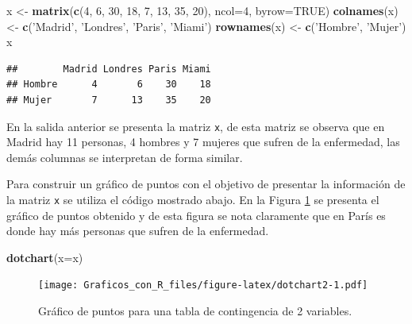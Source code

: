 \documentclass[10pt,]{krantz}
\makeatletter
\newenvironment{Shaded}{\begin{snugshade}}{\end{snugshade}}
\newcommand{\KeywordTok}[1]{\textcolor[rgb]{0.13,0.29,0.53}{\textbf{#1}}}
\newcommand{\DataTypeTok}[1]{\textcolor[rgb]{0.13,0.29,0.53}{#1}}
\newcommand{\DecValTok}[1]{\textcolor[rgb]{0.00,0.00,0.81}{#1}}
\newcommand{\StringTok}[1]{\textcolor[rgb]{0.31,0.60,0.02}{#1}}
\newcommand{\OtherTok}[1]{\textcolor[rgb]{0.56,0.35,0.01}{#1}}
\newcommand{\NormalTok}[1]{#1}
\newenvironment{kframe}{%
\medskip{}
\setlength{\fboxsep}{.8em}
 \def\at@end@of@kframe{}%
 \ifinner\ifhmode%
  \def\at@end@of@kframe{\end{minipage}}%
  \begin{minipage}{\columnwidth}%
 \fi\fi%
 \def\FrameCommand##1{\hskip\@totalleftmargin \hskip-\fboxsep
 \colorbox{shadecolor}{##1}\hskip-\fboxsep
     \hskip-\linewidth \hskip-\@totalleftmargin \hskip\columnwidth}%
 \MakeFramed {\advance\hsize-\width
   \@totalleftmargin\z@ \linewidth\hsize
   \@setminipage}}%
 {\par\unskip\endMakeFramed%
 \at@end@of@kframe}
\renewenvironment{Shaded}{\begin{kframe}}{\end{kframe}}
\makeatother
\begin{document}
\begin{Shaded}
\begin{Highlighting}[]
\NormalTok{x <-}\StringTok{ }\KeywordTok{matrix}\NormalTok{(}\KeywordTok{c}\NormalTok{(}\DecValTok{4}\NormalTok{, }\DecValTok{6}\NormalTok{, }\DecValTok{30}\NormalTok{, }\DecValTok{18}\NormalTok{, }\DecValTok{7}\NormalTok{, }\DecValTok{13}\NormalTok{, }\DecValTok{35}\NormalTok{, }\DecValTok{20}\NormalTok{),}
            \DataTypeTok{ncol=}\DecValTok{4}\NormalTok{, }\DataTypeTok{byrow=}\OtherTok{TRUE}\NormalTok{)}
\KeywordTok{colnames}\NormalTok{(x) <-}\StringTok{ }\KeywordTok{c}\NormalTok{(}\StringTok{'Madrid'}\NormalTok{, }\StringTok{'Londres'}\NormalTok{, }\StringTok{'Paris'}\NormalTok{, }\StringTok{'Miami'}\NormalTok{)}
\KeywordTok{rownames}\NormalTok{(x) <-}\StringTok{ }\KeywordTok{c}\NormalTok{(}\StringTok{'Hombre'}\NormalTok{, }\StringTok{'Mujer'}\NormalTok{)}
\NormalTok{x}
\end{Highlighting}
\end{Shaded}

\begin{verbatim}
##        Madrid Londres Paris Miami
## Hombre      4       6    30    18
## Mujer       7      13    35    20
\end{verbatim}

En la salida anterior se presenta la matriz \texttt{x}, de esta matriz
se observa que en Madrid hay 11 personas, 4 hombres y 7 mujeres que
sufren de la enfermedad, las demás columnas se interpretan de forma
similar.

Para construir un gráfico de puntos con el objetivo de presentar la
información de la matriz \texttt{x} se utiliza el código mostrado abajo.
En la Figura \ref{fig:dotchart2} se presenta el gráfico de puntos
obtenido y de esta figura se nota claramente que en París es donde hay
más personas que sufren de la enfermedad.

\begin{Shaded}
\begin{Highlighting}[]
\KeywordTok{dotchart}\NormalTok{(}\DataTypeTok{x=}\NormalTok{x)}
\end{Highlighting}
\end{Shaded}

\begin{figure}
\centering
\texttt{[image: Graficos\_con\_R\_files/figure-latex/dotchart2-1.pdf]}
\caption{\label{fig:dotchart2}Gráfico de puntos para una tabla de
contingencia de 2 variables.}
\end{figure}
\end{document}
